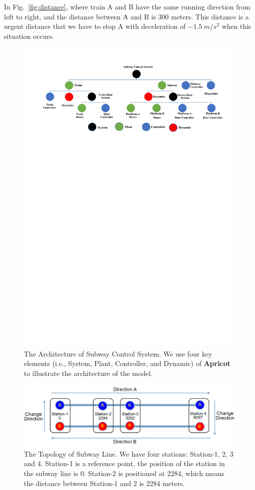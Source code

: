 \documentclass{WileySix}
\newcommand{\apricot}{\bfseries Apricot}
\begin{document}
In Fig.~\ref{fig:distance}, where train A and B have the same running direction from left to right, and the distance between A and B is 300 meters.
This distance is a urgent distance that we have to stop A with deceleration of $-1.5~m/s^2$ when this situation occurs.
\begin{figure}
\centering
\includegraphics[width=1\linewidth]{./figs/systemstructure}
\caption[The Architecture of Subway Control System]{The Architecture of Subway Control System.
We use four key elements (i.e., System, Plant, Controller, and Dynamic) of {\apricot} to illustrate the architecture of the model.}
\label{fig:systemstructure}
\end{figure}

\begin{figure}
\centering
\includegraphics[width=0.8\linewidth]{./figs/sbwl}
\caption[The Topology of Subway Line]{The Topology of Subway Line. We have four stations: Station-1, 2, 3 and 4. Station-1 is a reference point, the position of the station in the subway line is 0. Station-2 is positioned at 2284, which means the distance between Station-1 and 2 is 2284 meters.}
\label{fig:sbwl}
\end{figure}
\end{document}
